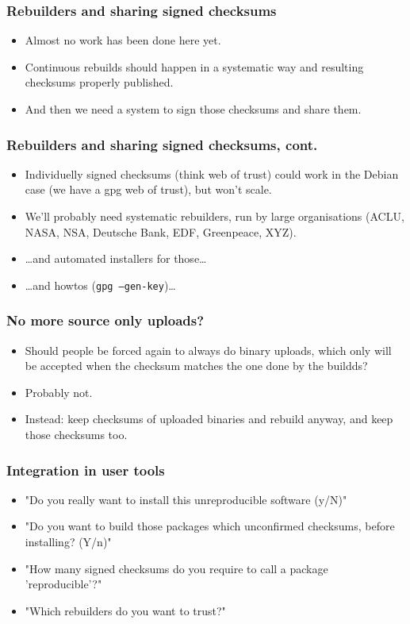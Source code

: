\documentclass[14pt]{beamer}
\begin{document}
\begin{frame}
 \frametitle{Rebuilders and sharing signed checksums}
 \begin{itemize}
  \item Almost no work has been done here yet.
  \item<2-3> Continuous rebuilds should happen in a systematic way and resulting
  checksums properly published.
  \item<3> And then we need a system to sign those checksums and share them. 
 \end{itemize}
\end{frame}

\begin{frame}
 \frametitle{Rebuilders and sharing signed checksums, cont.}
 \begin{itemize}
  \item Individuelly signed checksums (think web of trust) could work in the
  Debian case (we have a gpg web of trust), but won't scale.
  \item<2-4> { We'll probably need systematic rebuilders, run by large organisations
  (ACLU, NASA, NSA, Deutsche Bank, EDF, Greenpeace, XYZ).}
  \item<3-4> { …and automated installers for those… }
  \item<4> { …and howtos (\texttt {gpg --gen-key})…}
 \end{itemize}
\end{frame}

\begin{frame}
 \frametitle{No more source only uploads?}
 \begin{itemize}
  \item Should people be forced again to always do binary uploads, which only
  will be accepted when the checksum matches the one done by the buildds?
  \item<2-3> Probably not.
  \item<3> Instead: keep checksums of uploaded binaries and rebuild anyway,
  and keep those checksums too.
 \end{itemize}
\end{frame}


\begin{frame}
 \frametitle{Integration in user tools}
 \begin{itemize}
  \item "Do you really want to install this unreproducible software (y/N)"
  \item<2-4> "Do you want to build those packages which unconfirmed checksums,
  before installing? (Y/n)"
  \item<3-4>{ "How many signed checksums do you require to call a package
  'reproducible'?"}
  \item<4>{ "Which rebuilders do you want to trust?"}
 \end{itemize}
\end{frame}
\end{document}
